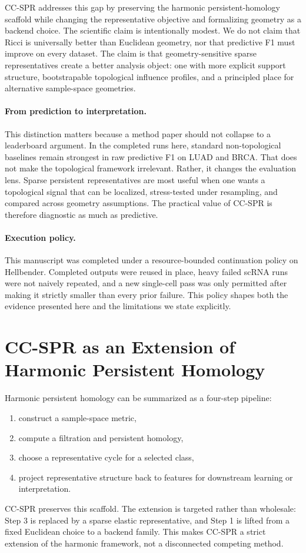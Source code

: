 \documentclass[11pt]{article}
\begin{document}
CC-SPR addresses this gap by preserving the harmonic persistent-homology scaffold while changing the representative objective and formalizing geometry as a backend choice. The scientific claim is intentionally modest. We do not claim that Ricci is universally better than Euclidean geometry, nor that predictive F1 must improve on every dataset. The claim is that geometry-sensitive sparse representatives create a better analysis object: one with more explicit support structure, bootstrapable topological influence profiles, and a principled place for alternative sample-space geometries.

\paragraph{From prediction to interpretation.}
This distinction matters because a method paper should not collapse to a leaderboard argument. In the completed runs here, standard non-topological baselines remain strongest in raw predictive F1 on LUAD and BRCA. That does not make the topological framework irrelevant. Rather, it changes the evaluation lens. Sparse persistent representatives are most useful when one wants a topological signal that can be localized, stress-tested under resampling, and compared across geometry assumptions. The practical value of CC-SPR is therefore diagnostic as much as predictive.

\paragraph{Execution policy.}
This manuscript was completed under a resource-bounded continuation policy on Hellbender. Completed outputs were reused in place, heavy failed scRNA runs were not naively repeated, and a new single-cell pass was only permitted after making it strictly smaller than every prior failure. This policy shapes both the evidence presented here and the limitations we state explicitly.

\section{CC-SPR as an Extension of Harmonic Persistent Homology}
Harmonic persistent homology can be summarized as a four-step pipeline:
\begin{enumerate}[leftmargin=1.5em]
\item construct a sample-space metric,
\item compute a filtration and persistent homology,
\item choose a representative cycle for a selected class,
\item project representative structure back to features for downstream learning or interpretation.
\end{enumerate}
CC-SPR preserves this scaffold. The extension is targeted rather than wholesale: Step 3 is replaced by a sparse elastic representative, and Step 1 is lifted from a fixed Euclidean choice to a backend family. This makes CC-SPR a strict extension of the harmonic framework, not a disconnected competing method.
\end{document}

